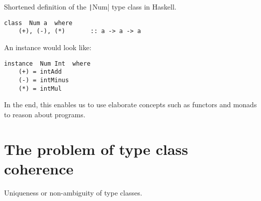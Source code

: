 Shortened definition of the \texttt|Num| type class in Haskell.

\begin{verbatim}
class  Num a  where
    (+), (-), (*)       :: a -> a -> a
\end{verbatim}

An instance would look like:

\begin{verbatim}
instance  Num Int  where
    (+) = intAdd
    (-) = intMinus
    (*) = intMul
\end{verbatim}






In the end, this enables us to use elaborate concepts such as functors and monads to reason about programs.

\cite{wadlerblott}

\section{The problem of type class coherence}

Uniqueness or non-ambiguity of type classes.
